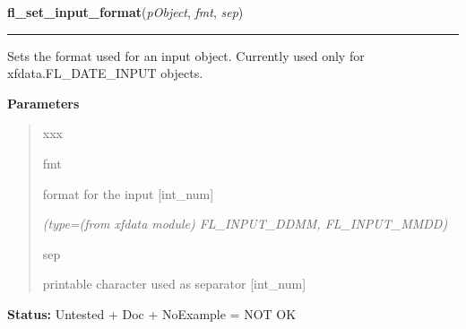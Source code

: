 \hspace{.8\funcindent}\begin{boxedminipage}{\funcwidth}

    \raggedright \textbf{fl\_set\_input\_format}(\textit{pObject}, \textit{fmt}, \textit{sep})

    \vspace{-1.5ex}

    \rule{\textwidth}{0.5\fboxrule}
\setlength{\parskip}{2ex}
    Sets the format used for an input object. Currently used only for 
    xfdata.FL\_DATE\_INPUT objects.

\setlength{\parskip}{1ex}
      \textbf{Parameters}
      \vspace{-1ex}

      \begin{quote}
        \begin{Ventry}{xxx}

          \item[fmt]

          format for the input [int\_num]

            {\it (type=(from xfdata module) FL\_INPUT\_DDMM, FL\_INPUT\_MMDD)}

          \item[sep]

          printable character used as separator [int\_num]

        \end{Ventry}

      \end{quote}

\textbf{Status:} Untested + Doc + NoExample = NOT OK



    \end{boxedminipage}

    \label{xformslib:library:fl_set_input_hscrollbar}

    \vspace{0.5ex}

